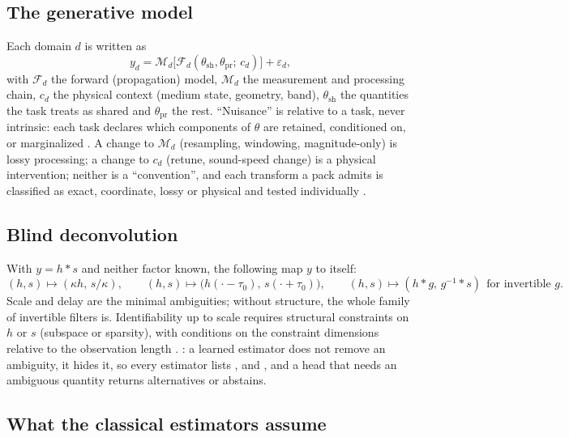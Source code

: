 \subsection{The generative model}

Each domain $d$ is written as
\begin{equation}
  y_d = \mathcal M_d\big[\mathcal F_d(\theta_{\mathrm{sh}},\theta_{\mathrm{pr}};\, c_d)\big] + \varepsilon_d ,
  \label{eq:generative}
\end{equation}
with $\mathcal F_d$ the forward (propagation) model, $\mathcal M_d$ the measurement and processing chain, $c_d$ the physical context (medium state, geometry, band), $\theta_{\mathrm{sh}}$ the quantities the task treats as shared and $\theta_{\mathrm{pr}}$ the rest. ``Nuisance'' is relative to a task, never intrinsic: each task declares which components of $\theta$ are retained, conditioned on, or marginalized \tagG{}. A change to $\mathcal M_d$ (resampling, windowing, magnitude-only) is lossy processing; a change to $c_d$ (retune, sound-speed change) is a physical intervention; neither is a ``convention'', and each transform a pack admits is classified as exact, coordinate, lossy or physical and tested individually \tagG{}.

\subsection{Blind deconvolution}

With $y=h*s$ and neither factor known, the following map $y$ to itself:
\begin{equation}
  (h,s)\mapsto(\kappa h,\,s/\kappa),\qquad
  (h,s)\mapsto\big(h(\cdot-\tau_0),\,s(\cdot+\tau_0)\big),\qquad
  (h,s)\mapsto(h*g,\,g^{-1}*s)\ \ \text{for invertible }g .
  \label{eq:ambig}
\end{equation}
Scale and delay are the minimal ambiguities; without structure, the whole family of invertible filters is. Identifiability up to scale requires structural constraints on $h$ or $s$ (subspace or sparsity), with conditions on the constraint dimensions relative to the observation length \citep{li2017}. \tagG{}: a learned estimator does not remove an ambiguity, it hides it, so every estimator lists ,  and , and a head that needs an ambiguous quantity returns alternatives or abstains.

\subsection{What the classical estimators assume}

